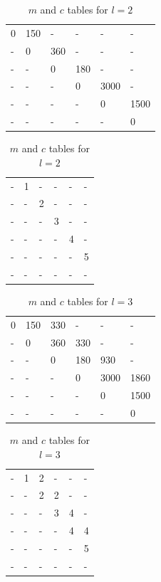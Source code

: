 \documentclass[11pt]{article}
\begin{document}
\begin{sol}
\begin{table}[htbp]
	\centering
	\begin{tabular}{|l|l|l|l|l|l|}
		 \hline
        0 & 150 & - & - & - & - \\ 
        - & 0 & 360 & - & - & - \\ 
        - & - & 0 & 180 & - & - \\ 
        - & - & - & 0 & 3000 & -\\ 
        - & - & - & - & 0 & 1500  \\ 
        - & - & - & - & - & 0 \\
        \hline
	\end{tabular}
	\hspace{20mm}
	\begin{tabular}{|l|l|l|l|l|l|}
		 \hline
        - & 1 & - & - & - & - \\ 
        - & - & 2 & - & - & - \\ 
        - & - & - & 3 & - & - \\ 
        - & - & - & - & 4 & - \\ 
        - & - & - & - & - & 5 \\ 
        - & - & - & - & - & - \\
        \hline
	\end{tabular}
	\caption{$m$ and $c$ tables for $l = 2$}
\end{table}

\begin{table}[htbp]
	\centering
	\begin{tabular}{|l|l|l|l|l|l|}
		 \hline
        0 & 150 & 330 & - & - & - \\ 
        - & 0 & 360 &330 & - & - \\ 
        - & - & 0 & 180 & 930 & - \\ 
        - & - & - & 0 & 3000 & 1860\\ 
        - & - & - & - & 0 & 1500  \\ 
        - & - & - & - & - & 0 \\
        \hline
	\end{tabular}
	\hspace{20mm}
	\begin{tabular}{|l|l|l|l|l|l|}
		 \hline
        - & 1 & 2 & - & - & - \\ 
        - & - & 2 & 2 & - & - \\ 
        - & - & - & 3 & 4 & - \\ 
        - & - & - & - & 4 & 4 \\ 
        - & - & - & - & - & 5 \\ 
        - & - & - & - & - & - \\
        \hline
	\end{tabular}
	\caption{$m$ and $c$ tables for $l = 3$}
\end{table}


\end{sol}
\end{document}
